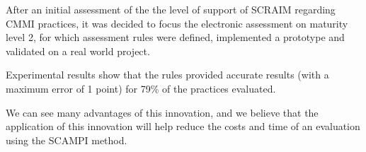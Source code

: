 After an initial assessment of the the level of support of SCRAIM regarding CMMI practices, it was decided to focus the electronic assessment on maturity level 2, for which assessment rules were defined, implemented a prototype and validated on a real world project.

Experimental results show that the rules provided accurate results (with a maximum error of 1 point) for 79\% of the practices evaluated.

We can see many advantages of this innovation, and we believe that the application of this innovation will help reduce the costs and time of an evaluation using the SCAMPI method.